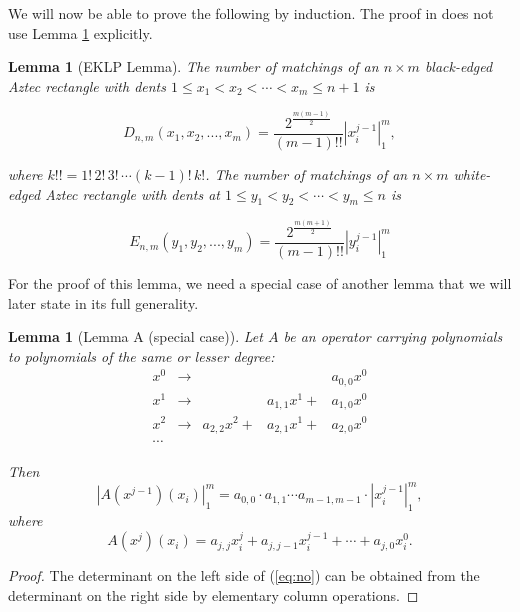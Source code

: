 \documentclass[10pt,reqno]{amsart}
\theoremstyle{plain}
\newtheorem{Lem}[Thm]{Lemma}
\theoremstyle{definition}
\theoremstyle{remark}
\def\determinant#1{\left|#1\right|}
\begin{document}
We will now be able to prove the following by induction. The proof
in \cite{EKLP} does not use Lemma \ref{Lem:A} explicitly.

\begin{Lem}[EKLP Lemma]\label{Lem:eklp}
The number of matchings of an $n\times m$ black-edged Aztec rectangle with
dents $1\leq x_1<x_2<\dotsb <x_m\leq n+1$ is

\begin{equation}
D_{n,m}(x_1,x_2,...,x_m) = \frac{2^{\frac{m(m-1)}{2}}}{(m-1)!!} 
			\determinant{x_i^{j-1}}_1^m,
\label{eq:DE} \end{equation}

where $k!! = 1!\, 2!\, 3!\, \dotsb (k-1)!\, k!$. 
The number of matchings of an $n\times m$ white-edged Aztec rectangle with dents
at $1\leq y_1<y_2<\dotsb <y_m\leq n$ is

\begin{equation}
E_{n,m}(y_1,y_2,...,y_m) = \frac{2^{\frac{m(m+1)}{2}}}{(m-1)!!} 
			\determinant{y_i^{j-1}}_1^m
\label{eq:ED} \end{equation}
\end{Lem}

For the proof of this lemma, we need a special case of another lemma that
we will later state in its full generality.

\begin{Lem}[Lemma A (special case)]\label{Lem:A}
Let $A$ be an operator carrying polynomials to
polynomials of the same or lesser degree:
\begin{equation}
\begin{matrix}
x^0 & \to & & & a_{0,0} x^0\\
x^1 & \to & & a_{1,1} x^1 + & a_{1,0} x^0\\
x^2 & \to & a_{2,2} x^2 + & a_{2,1} x^1 + & a_{2,0} x^0\\
\dotsb
\end{matrix}
\end{equation}

Then \begin{equation}
\determinant{A(x^{j-1})(x_i)}_1^m = 
 a_{0,0}\cdot a_{1,1} \dotsb a_{m-1,m-1} \cdot \determinant{x_i^{j-1}}_1^m,
\label{eq:no}
\end{equation}
where 
\begin{equation} 
A(x^j)(x_i) = 
      a_{j,j} x_i^j + a_{j,j-1} x_i^{j-1} + \dotsb + a_{j,0} x_i^0.
\end{equation}
\end{Lem}
\begin{proof}
The determinant on the left side of (\ref{eq:no}) can be obtained from
the determinant on the right side by elementary column operations.
\end{proof}
\end{document}
